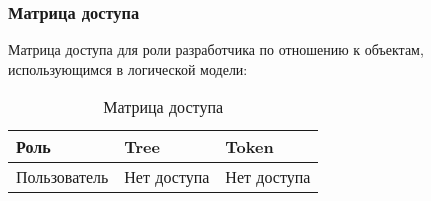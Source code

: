 \subsubsection{Матрица доступа}

Матрица доступа для роли разработчика по отношению к объектам,
использующимся в логической модели:

\begin{longtable}{|p{5.3cm}|p{5.3cm}|p{5.3cm}|}
	\caption{Матрица доступа} \\
	\hline
	\textbf{Роль} & \textbf{Tree} & \textbf{Token} \\
	\hline
	\endhead
	Пользователь & Нет доступа & Нет доступа \\ \hline
\end{longtable}

